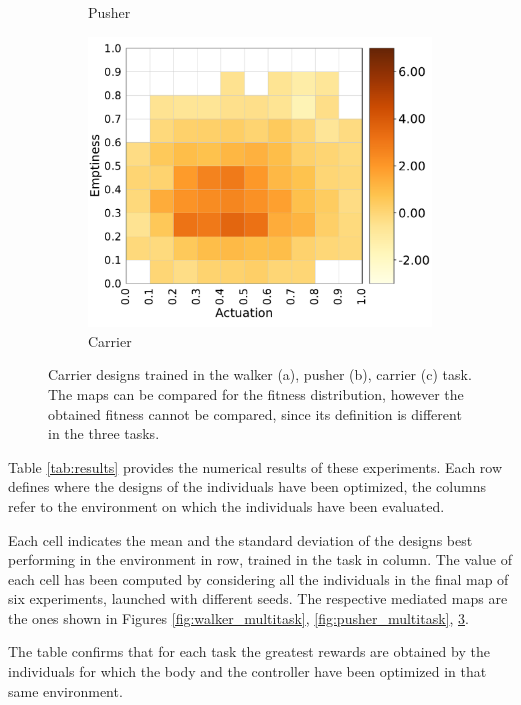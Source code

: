 \begin{figure}
\begin{subfigure}[b]{0.3\textwidth}
         \caption{Pusher}
         \label{carrier_b}
    \end{subfigure}
    \hfill
    \begin{subfigure}[b]{0.3\textwidth}
         \centering
         \includegraphics[scale=0.3]{images/multitasking/carrier.pdf}
         \caption{Carrier}
         \label{carrier_c}
    \end{subfigure}
    \caption{Carrier designs trained in the walker (a), pusher (b), carrier (c) task.
    The maps can be compared for the fitness distribution, however the obtained fitness cannot be compared, since its definition is different in the three tasks.}
    \label{fig:carrier_multitask}
\end{figure}


Table \ref{tab:results} provides the numerical results of these experiments.
Each row defines where the designs of the individuals have been optimized, the columns refer to the environment on which the individuals have been evaluated.

Each cell indicates the mean and the standard deviation of the designs best performing in the environment in row, trained in the task in column.
The value of each cell has been computed by considering all the individuals in the final map of six experiments, launched with different seeds. The respective mediated maps are the ones shown in Figures \ref{fig:walker_multitask}, \ref{fig:pusher_multitask}, \ref{fig:carrier_multitask}.

The table confirms that for each task the greatest rewards are obtained by the individuals for which the body and the controller have been optimized in that same environment.

